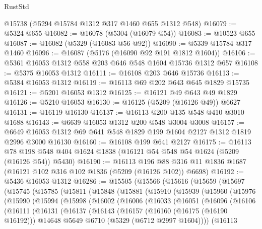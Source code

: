 \begin{lexlean}{RustStd}
\begin{coremodule}
    @15738
    (@5294 @15784 @1312 @317 @1460 @655 @1312 @548)
@16079 := @5324 @655
@16082 := @16078 (@5304 (@16079 @54))
@16083 := @10523 @655
@16087 := @16082 (@5329 (@16083 @56 @92))
@16090 := @5339 @15784 @317 @1460
@16096 := @16087 (@5176 (@16090 @92 @191 @1812 @1604))
@16106 := @5361 @16053 @1312 @558 @203 @646 @548 @1604 @15736 @1312 @657
@16108 := @5375 @16053 @1312
@16111 := @16108 @203 @646 @15736
@16113 := @5384 @16053 @1312
@16119 := @16113 @69 @202 @643 @645 @1829 @15735
@16121 := @5201 @16053 @1312
@16125 := @16121 @49 @643 @49 @1829
@16126 := @5210 @16053
@16130 := @16125 (@5209 (@16126 @49)) @6627
@16131 := @16119 @16130
@16137 := @16113 @200 @135 @548 @410 @3010 @1688
@16143 := @6639 @16053 @1312 @200 @548 @3004 @3008
@16157 := @6649 @16053 @1312 @69 @641 @548 @1829 @199 @1604 @2127 @1312 @1819 @2996 @3000 @16130
@16160 := @16108 @199 @641 @2127
@16175 := @16113
    @78
    @198
    @548
    @404
    @1624
    @1838
    (@16121 @54 @548 @54 @1624 (@5209 (@16126 @54)) @5430)
@16190 := @16113
    @196
    @88
    @316
    @11
    @1836
    @1687
    (@16121 @102 @316 @102 @1836 (@5209 (@16126 @102)) @6698)
@16192 := @5436 @16053 @1312
@16286 := @15505
    (@15566
      (@15616
        (@15659
          (@15697
            (@15745
              (@15785
                (@15811
                  (@15848
                    (@15881
                      (@15910
                        (@15939
                          (@15960
                            (@15976
                              (@15990
                                (@15994
                                  (@15998
                                    (@16002
                                      (@16006
                                        (@16033
                                          (@16051
                                            (@16096
                                              (@16106
                                                (@16111
                                                  (@16131
                                                    (@16137
                                                      (@16143
                                                        (@16157
                                                          (@16160 (@16175 (@16190 @16192)))
                                                          @14648
                                                          @5649
                                                          @6710
                                                          (@5329 (@6712 @2997 @1604))))
                                                      (@16113

\end{coremodule}
\end{lexlean}
